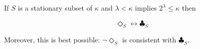 \documentclass[12pt]{article}
\begin{document}
If $S$ is a stationary subset of $\kappa$ and $\lambda<\kappa$ implies $2^\lambda\leq\kappa$ then

$$\Diamond_S\leftrightarrow \clubsuit_S$$

Moreover, this is best possible: $\neg\Diamond_S$ is consistent with $\clubsuit_S$.
\end{document}
